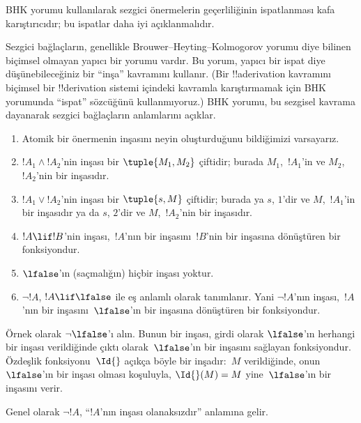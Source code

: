 \documentclass[../../../include/open-logic-section]{subfiles}
\begin{document}


\begin{editorial}
  BHK yorumu kullanılarak sezgici önermelerin geçerliliğinin ispatlanması
  kafa karıştırıcıdır; bu ispatlar daha iyi açıklanmalıdır.
\end{editorial}

Sezgici bağlaçların, genellikle Brouwer--Heyting--Kolmogorov yorumu diye
bilinen biçimsel olmayan yapıcı bir yorumu vardır. Bu yorum, yapıcı bir ispat
diye düşünebileceğiniz bir ``inşa'' kavramını kullanır. (Bir !!a{derivation}
kavramını biçimsel bir !!{derivation} sistemi içindeki kavramla karıştırmamak
için BHK yorumunda ``ispat'' sözcüğünü kullanmıyoruz.) BHK yorumu, bu sezgisel
kavrama dayanarak sezgici bağlaçların anlamlarını açıklar.

\begin{enumerate}
\item Atomik bir önermenin inşasını neyin oluşturduğunu bildiğimizi varsayarız.
\item $!A_1 \land !A_2$'nin inşası bir $\tuple{M_1, M_2}$ çiftidir; burada
  $M_1$,~$!A_1$'in ve $M_2$,~$!A_2$'nin bir inşasıdır.
\item $!A_1 \lor !A_2$'nin inşası bir $\tuple{s, M}$ çiftidir; burada ya $s$,
  $1$'dir ve $M$,~$!A_1$'in bir inşasıdır ya da $s$, $2$'dir ve $M$,~$!A_2$'nin
  bir inşasıdır.
\item $!A \lif !B$'nin inşası,~$!A$'nın bir inşasını~$!B$'nin bir inşasına
  dönüştüren bir fonksiyondur.
\item $\lfalse$'ın (saçmalığın) hiçbir inşası yoktur.
\item $\lnot !A$, $!A \lif \lfalse$ ile eş anlamlı olarak tanımlanır. Yani
  $\lnot !A$'nın inşası,~$!A$'nın bir inşasını~$\lfalse$'ın bir inşasına
  dönüştüren bir fonksiyondur.
\end{enumerate}

\begin{ex}
Örnek olarak $\lnot \lfalse$'ı alın. Bunun bir inşası, girdi olarak
$\lfalse$'ın herhangi bir inşası verildiğinde çıktı olarak~$\lfalse$'ın bir
inşasını sağlayan fonksiyondur. Özdeşlik fonksiyonu~$\Id{}$ açıkça böyle bir
inşadır:~$M$ verildiğinde, onun~$\lfalse$'ın bir inşası olması koşuluyla,
$\Id{}(M) = M$ yine~$\lfalse$'ın bir inşasını verir.
\end{ex}

Genel olarak $\lnot !A$, ``$!A$'nın inşası olanaksızdır'' anlamına gelir.
\end{document}
